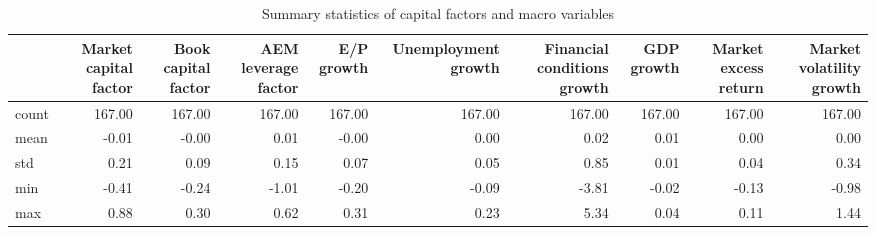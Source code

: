 \begin{table}
\caption{Summary statistics of capital factors and macro variables}
\label{tab:Table 2.1}
\begin{tabular}{lrrrrrrrrr}
\toprule
 & Market capital factor & Book capital factor & AEM leverage factor & E/P growth & Unemployment growth & Financial conditions growth & GDP growth & Market excess return & Market volatility growth \\
\midrule
count & 167.00 & 167.00 & 167.00 & 167.00 & 167.00 & 167.00 & 167.00 & 167.00 & 167.00 \\
mean & -0.01 & -0.00 & 0.01 & -0.00 & 0.00 & 0.02 & 0.01 & 0.00 & 0.00 \\
std & 0.21 & 0.09 & 0.15 & 0.07 & 0.05 & 0.85 & 0.01 & 0.04 & 0.34 \\
min & -0.41 & -0.24 & -1.01 & -0.20 & -0.09 & -3.81 & -0.02 & -0.13 & -0.98 \\
max & 0.88 & 0.30 & 0.62 & 0.31 & 0.23 & 5.34 & 0.04 & 0.11 & 1.44 \\
\bottomrule
\end{tabular}
\end{table}
